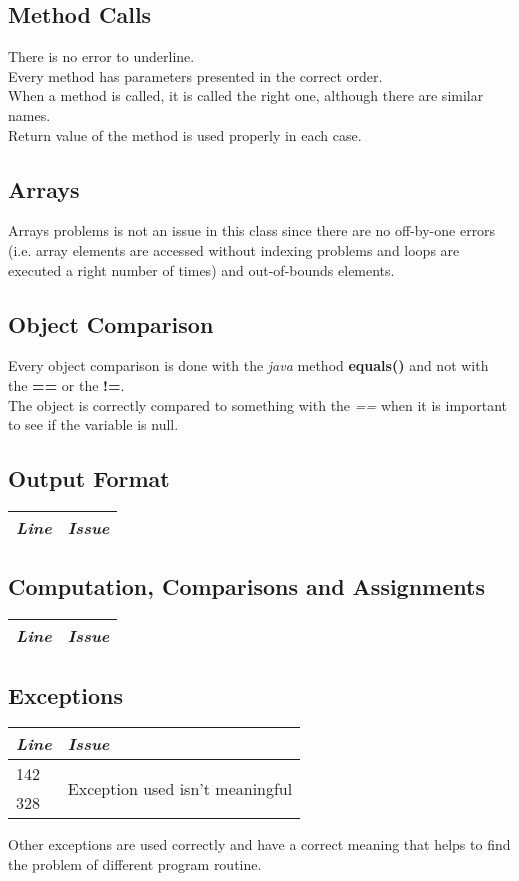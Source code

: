\documentclass[11pt,a4paper]{report}
\begin{document}
\subsection{Method Calls}
There is no error to underline.\\Every method has parameters presented in the correct order.\\When a method is called, it is called the right one, although there are similar names.\\Return value of the method is used properly in each case. 
\subsection{Arrays}
Arrays problems is not an issue in this class since there are no off-by-one errors (i.e. array elements are accessed without indexing problems and loops are executed a right number of times) and out-of-bounds elements.
\subsection{Object Comparison}
Every object comparison is done with the \textit{java} method \textbf{equals()} and not with the \textbf{==} or the \textbf{!=}.\\The object is correctly compared to something with the \textit{==} when it is important to see if the variable is null.
\subsection{Output Format}
\begin{tabularx}{\textwidth}{|l|X|}
	\hline
	\textit{Line} & \textit{Issue}\\
	\hline
\end{tabularx}
\subsection{Computation, Comparisons and Assignments}
\begin{tabularx}{\textwidth}{|l|X|}
	\hline
	\textit{Line} & \textit{Issue}\\
	\hline
\end{tabularx}
\subsection{Exceptions}
\begin{tabularx}{\textwidth}{|l|X|}
	\hline
	\textit{Line} & \textit{Issue}\\
	\hline
	142 & \multirow{2}{*}{Exception used isn't meaningful}\\
	328 & \\
	\hline
\end{tabularx}
Other exceptions are used correctly and have a correct meaning that helps to find the problem of different program routine.
\end{document}
